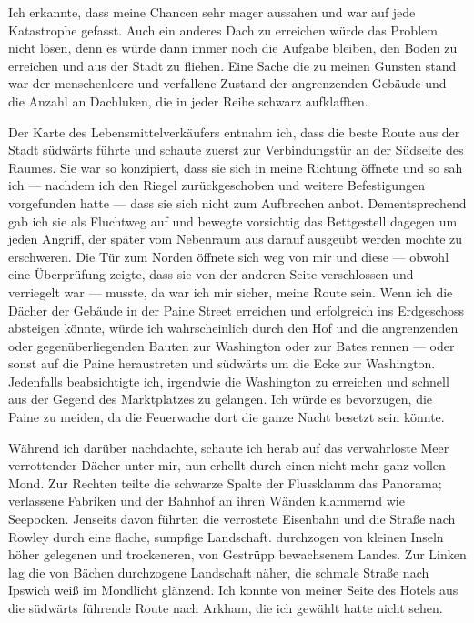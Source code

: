 Ich erkannte, dass meine Chancen sehr mager aussahen und war auf jede Katastrophe gefasst. Auch ein anderes Dach zu erreichen würde das Problem nicht lösen, denn es würde dann immer noch die Aufgabe bleiben, den Boden zu erreichen und aus der Stadt zu fliehen. Eine Sache die zu meinen Gunsten stand war der menschenleere und verfallene Zustand der angrenzenden Gebäude und die Anzahl an Dachluken, die in jeder Reihe schwarz aufklafften.

Der Karte des Lebensmittelverkäufers entnahm ich, dass die beste Route aus der Stadt südwärts führte und schaute zuerst zur Verbindungstür an der Südseite des Raumes. Sie war so konzipiert, dass sie sich in meine Richtung öffnete und so sah ich --- nachdem ich den Riegel zurückgeschoben und weitere Befestigungen vorgefunden hatte --- dass sie sich nicht zum Aufbrechen anbot. Dementsprechend gab ich sie als Fluchtweg auf und bewegte vorsichtig das Bettgestell dagegen um jeden Angriff, der später vom Nebenraum aus darauf ausgeübt werden mochte zu erschweren. Die Tür zum Norden öffnete sich weg von mir und diese --- obwohl eine Überprüfung zeigte, dass sie von der anderen Seite verschlossen und verriegelt war --- musste, da war ich mir sicher, meine Route sein. Wenn ich die Dächer der Gebäude in der Paine Street erreichen und erfolgreich ins Erdgeschoss absteigen könnte, würde ich wahrscheinlich durch den Hof und die angrenzenden oder gegenüberliegenden Bauten zur Washington oder zur Bates rennen --- oder sonst auf die Paine heraustreten und südwärts um die Ecke zur Washington. Jedenfalls beabsichtigte ich, irgendwie die Washington zu erreichen und schnell aus der Gegend des Marktplatzes zu gelangen. Ich würde es bevorzugen, die Paine zu meiden, da die Feuerwache dort die ganze Nacht besetzt sein könnte.

Während ich darüber nachdachte, schaute ich herab auf das verwahrloste Meer verrottender Dächer unter mir, nun erhellt durch einen nicht mehr ganz vollen Mond. Zur Rechten teilte die schwarze Spalte der Flussklamm das Panorama; verlassene Fabriken und der Bahnhof an ihren Wänden klammernd wie Seepocken. Jenseits davon führten die verrostete Eisenbahn und die Straße nach Rowley durch eine flache, sumpfige Landschaft. durchzogen von kleinen Inseln höher gelegenen und trockeneren, von Gestrüpp bewachsenem Landes. Zur Linken lag die von Bächen durchzogene Landschaft näher, die schmale Straße nach Ipswich weiß im Mondlicht glänzend. Ich konnte von meiner Seite des Hotels aus die südwärts führende Route nach Arkham, die ich gewählt hatte nicht sehen.

